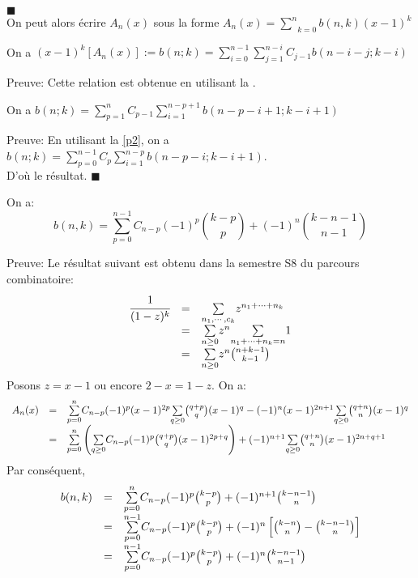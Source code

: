 $\blacksquare$\vspace{10pt}\\
On peut alors écrire $A_{n}(x)$ sous la forme $A_{n}(x)= \underset{k=0}{\overset{n}{\sum}}b(n,k)(x-1)^{k}$
\begin{proposition}\label{p2}
	On a $(x-1)^{k}[A_{n}(x)] := b(n; k) = \sum\limits_{i=0}^{n-1} \sum\limits_{j=1}^{n-i}C_{j-1}b(n-i-j; k-i)$
\end{proposition}
Preuve: Cette relation est obtenue en utilisant la .
\begin{corollaire} \label{c4}
	On a
	$b(n;k) = \sum\limits_{p=1}^{n}C_{p-1} \sum\limits_{i=1}^{n-p+1}b(n-p-i+1; k-i+1)$
\end{corollaire}
Preuve: En utilisant la \cref{p2}, on a $b(n; k)= \sum\limits_{p=0}^{n-1}C_{p} \sum\limits_{i=1}^{n-p}b(n-p-i; k-i+1)$. \\
D'où le résultat. $\blacksquare$\vspace{5pt}
\begin{proposition} \label{formExplicitOfbnk}
	On a:
	\[
		b(n,k)= \underset{p=0}{\overset{n-1}{\sum}}C_{n-p}(-1)^p\binom{k-p}{p}+(-1)^n\binom{k-n-1}{n-1}
	\]
\end{proposition}
Preuve:
Le résultat suivant est obtenu dans la semestre S8 du parcours combinatoire:
\[
	\begin{array}{r c l}
		\cfrac{1}{(1-z)^k} & = & \underset{n_{1},\cdots,c_{k}}{\sum}z^{n_{1}+\cdots+n_{k}}        \\
		                   & = & \underset{n\geq0}{\sum}z^n\underset{n_{1}+\cdots+n_{k}=n}{\sum}1 \\
		                   & = & \underset{n\geq 0}{\sum}z^n\binom{n+k-1}{k-1}
	\end{array}
\]
Posons $z=x-1$ ou encore $2-x=1-z$. On a:
\[
	\begin{array}{r c l}
		A_{n}(x) & = & \underset{p=0}{\overset{n}{\sum}}C_{n-p}(-1)^p(x-1)^{2p}\underset{q\geq 0}{\sum}\binom{q+p}{q}(x-1)^q-(-1)^n(x-1)^{2n+1}\underset{q\geq0}{\sum}\binom{q+n}{n}(x-1)^q       \\
		         & = & \underset{p=0}{\overset{n}{\sum}}\left(\underset{q\geq0}{\sum}C_{n-p}(-1)^p\binom{q+p}{q}(x-1)^{2p+q}\right)+(-1)^{n+1}\underset{q\geq0}{\sum}\binom{q+n}{n}(x-1)^{2n+q+1} \\
	\end{array}
\]
Par conséquent,
\[
	\begin{array} {r c l}
		b(n,k) & = & \underset{p=0}{\overset{n}{\sum}}C_{n-p}(-1)^p\binom{k-p}{p}+(-1)^{n+1}\binom{k-n-1}{n}                             \\
		       & = & \underset{p=0}{\overset{n-1}{\sum}}C_{n-p}(-1)^p\binom{k-p}{p}+(-1)^n\left[ \binom{k-n}{n}-\binom{k-n-1}{n} \right] \\
		       & = & \underset{p=0}{\overset{n-1}{\sum}}C_{n-p}(-1)^p\binom{k-p}{p}+(-1)^n\binom{k-n-1}{n-1}
	\end{array}
\]
